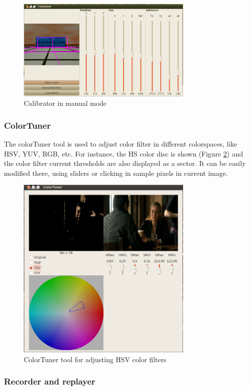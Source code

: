 \documentclass[twocolumn]{svjour3}          %
\begin{document}
\begin{figure}[h!]
  \includegraphics[width=8.5cm]{figs/calibratorGUI.png}
\caption{Calibrator in manual mode}
\label{fig:calibrator}
\end{figure}

\subsubsection{ColorTuner}

The colorTuner tool is used to adjust color filter in different colorspaces, like HSV, YUV, RGB, etc. For instance, the HS color disc is shown (Figure \ref{fig:colortuner}) and the color filter current thresholds are also displayed as a sector. It can be easily modified there, using sliders or clicking in sample pixels in current image.

\begin{figure}[h!]
  \includegraphics[width=8.5cm]{figs/colorTunerHSV.png}
\caption{ColorTuner tool for adjusting HSV color filters}
\label{fig:colortuner}
\end{figure}


\subsubsection{Recorder and replayer}
\end{document}
